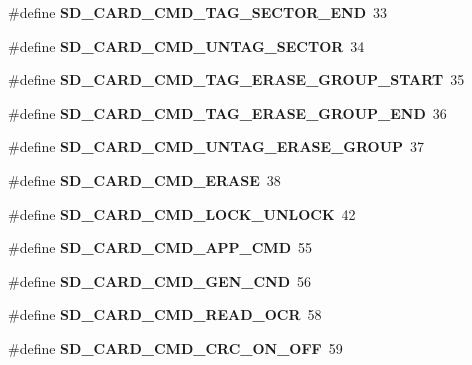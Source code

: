 \begin{Indent}
\begin{DoxyCompactItemize}
\item 
\mbox{\label{spi-sd-card_8c_a6d74d20781ba1ab95e022cdcf7c83327}} 
\#define {\bfseries S\+D\+\_\+\+C\+A\+R\+D\+\_\+\+C\+M\+D\+\_\+\+T\+A\+G\+\_\+\+S\+E\+C\+T\+O\+R\+\_\+\+E\+ND}~33
\item 
\mbox{\label{spi-sd-card_8c_aa88dfd88c108ae27849050ba0a8e7f9b}} 
\#define {\bfseries S\+D\+\_\+\+C\+A\+R\+D\+\_\+\+C\+M\+D\+\_\+\+U\+N\+T\+A\+G\+\_\+\+S\+E\+C\+T\+OR}~34
\item 
\mbox{\label{spi-sd-card_8c_a7e1dafb789322e7b58f533b5ca4013df}} 
\#define {\bfseries S\+D\+\_\+\+C\+A\+R\+D\+\_\+\+C\+M\+D\+\_\+\+T\+A\+G\+\_\+\+E\+R\+A\+S\+E\+\_\+\+G\+R\+O\+U\+P\+\_\+\+S\+T\+A\+RT}~35
\item 
\mbox{\label{spi-sd-card_8c_ae1a73c7f41864d128d943ff2fb37bdf0}} 
\#define {\bfseries S\+D\+\_\+\+C\+A\+R\+D\+\_\+\+C\+M\+D\+\_\+\+T\+A\+G\+\_\+\+E\+R\+A\+S\+E\+\_\+\+G\+R\+O\+U\+P\+\_\+\+E\+ND}~36
\item 
\mbox{\label{spi-sd-card_8c_ae03564b0782d09892a14c880c17a3fb1}} 
\#define {\bfseries S\+D\+\_\+\+C\+A\+R\+D\+\_\+\+C\+M\+D\+\_\+\+U\+N\+T\+A\+G\+\_\+\+E\+R\+A\+S\+E\+\_\+\+G\+R\+O\+UP}~37
\item 
\mbox{\label{spi-sd-card_8c_a1bcdb0ce24cd75f9fdda32251dcf91d9}} 
\#define {\bfseries S\+D\+\_\+\+C\+A\+R\+D\+\_\+\+C\+M\+D\+\_\+\+E\+R\+A\+SE}~38
\item 
\mbox{\label{spi-sd-card_8c_af50352ee635b5fbe01a061e036f407d7}} 
\#define {\bfseries S\+D\+\_\+\+C\+A\+R\+D\+\_\+\+C\+M\+D\+\_\+\+L\+O\+C\+K\+\_\+\+U\+N\+L\+O\+CK}~42
\item 
\mbox{\label{spi-sd-card_8c_ae9b8455b5327d80dbde9cc6464e197d2}} 
\#define {\bfseries S\+D\+\_\+\+C\+A\+R\+D\+\_\+\+C\+M\+D\+\_\+\+A\+P\+P\+\_\+\+C\+MD}~55
\item 
\mbox{\label{spi-sd-card_8c_a2f7034d0b8f4a6ffbd72295b0258c0f3}} 
\#define {\bfseries S\+D\+\_\+\+C\+A\+R\+D\+\_\+\+C\+M\+D\+\_\+\+G\+E\+N\+\_\+\+C\+ND}~56
\item 
\mbox{\label{spi-sd-card_8c_a2060b1bbd7a233dfb6db31f38f4a138b}} 
\#define {\bfseries S\+D\+\_\+\+C\+A\+R\+D\+\_\+\+C\+M\+D\+\_\+\+R\+E\+A\+D\+\_\+\+O\+CR}~58
\item 
\mbox{\label{spi-sd-card_8c_ad3797d4ca921db12c89cbbe22817dac6}} 
\#define {\bfseries S\+D\+\_\+\+C\+A\+R\+D\+\_\+\+C\+M\+D\+\_\+\+C\+R\+C\+\_\+\+O\+N\+\_\+\+O\+FF}~59
\end{DoxyCompactItemize}
\end{Indent}
